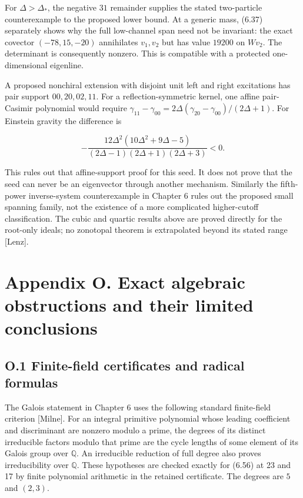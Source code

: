 \documentclass[a4paper,11pt]{article}
\numberwithin{equation}{section}
\begin{document}
For \(\Delta>\Delta_*\), the negative \(31\) remainder supplies the stated two-particle counterexample to the proposed lower bound. At a generic mass, (6.37) separately shows why the full low-channel span need not be invariant: the exact covector \((-78,15,-20)\) annihilates \(v_1,v_2\) but has value \(19200\) on \(Wv_2\). The determinant is consequently nonzero. This is compatible with a protected one-dimensional eigenline.

A proposed nonchiral extension with disjoint unit left and right excitations has pair support \(00,20,02,11\). For a reflection-symmetric kernel, one affine pair-Casimir polynomial would require \(\gamma_{11}-\gamma_{00}=2\Delta(\gamma_{20}-\gamma_{00})/(2\Delta+1)\). For Einstein gravity the difference is

\[
-\frac{12\Delta^2(10\Delta^2+9\Delta-5)}{(2\Delta-1)(2\Delta+1)(2\Delta+3)}<0.
\tag{L.26}
\]

This rules out that affine-support proof for this seed. It does not prove that the seed can never be an eigenvector through another mechanism. Similarly the fifth-power inverse-system counterexample in Chapter 6 rules out the proposed small spanning family, not the existence of a more complicated higher-cutoff classification. The cubic and quartic results above are proved directly for the root-only ideals; no zonotopal theorem is extrapolated beyond its stated range {[}Lenz{]}.

\clearpage
\hypertarget{appendix-o.-exact-algebraic-obstructions-and-their-limited-conclusions}{%
\section{Appendix O. Exact algebraic obstructions and their limited conclusions}\label{appendix-o.-exact-algebraic-obstructions-and-their-limited-conclusions}}

\hypertarget{o.1-finite-field-certificates-and-radical-formulas}{%
\subsection{O.1 Finite-field certificates and radical formulas}\label{o.1-finite-field-certificates-and-radical-formulas}}

The Galois statement in Chapter 6 uses the following standard finite-field criterion {[}Milne{]}. For an integral primitive polynomial whose leading coefficient and discriminant are nonzero modulo a prime, the degrees of its distinct irreducible factors modulo that prime are the cycle lengths of some element of its Galois group over \(\mathbb Q\). An irreducible reduction of full degree also proves irreducibility over \(\mathbb Q\). These hypotheses are checked exactly for (6.56) at 23 and 17 by finite polynomial arithmetic in the retained certificate. The degrees are \(5\) and \((2,3)\).
\end{document}
